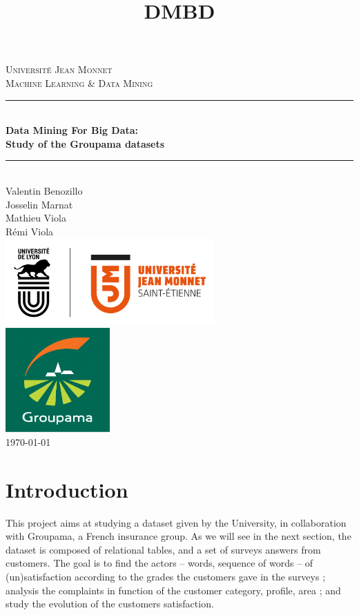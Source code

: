 \documentclass[a4paper, 11pt]{article}
\title{DMBD}
\newcommand{\HRule}{\rule{\linewidth}{0.5mm}}
\begin{document}
\thispagestyle{empty}
	\vspace{2cm}
	\begin{center}
		\LARGE{\textsc{Université Jean Monnet}}\\[1cm]
		\Large{\textsc{Machine Learning \& Data Mining}} \\[0.5cm]
		\HRule \\[0.5cm]
		{ \huge \bfseries Data Mining For Big Data:\\[.5em]Study of the Groupama datasets}\\[0.4cm]
		\HRule \\[1cm]
        Valentin Benozillo \\
        Josselin Marnat \\
        Mathieu Viola \\
        Rémi Viola \\
		\normalsize
		\vfill
        \includegraphics[width=8cm]{Img/UJM.png} \\[1cm]
        \includegraphics[width=4cm]{Img/groupama.jpg} \\[1cm]
		\vfill
        \today
	\end{center}
	\newpage

\newpage



\tableofcontents

\newpage
\section{Introduction} %
\label{sec:intro}
	This project aims at studying a dataset given by the University, in collaboration with Groupama, a French insurance group. As we will see in the next section, the dataset is composed of relational tables, and a set of surveys answers from customers. The goal is to find the actors -- words, sequence of words -- of (un)satisfaction according to the grades the customers gave in the surveys ; analysis the complaints in function of the customer category, profile, area ; and study the evolution of the customers satisfaction.
\end{document}
